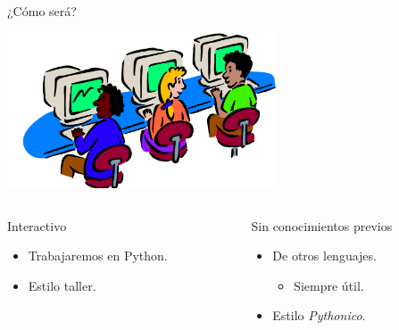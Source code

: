\documentclass[bigger,unknownkeysallowed]{beamer}
\begin{document}
\begin{frame}[label={sec:org0f1b801}]{¿Cómo será?}
\begin{center}
\begin{center}
\includegraphics[width=0.6\textwidth]{clase.png}
\end{center}
\end{center}

\begin{columns}
\begin{column}{0.5\columnwidth}
\begin{block}{Interactivo}
\begin{itemize}
\item Trabajaremos en Python.
\item Estilo taller.
\end{itemize}
\end{block}
\end{column}

\begin{column}{0.5\columnwidth}
\begin{block}{Sin conocimientos previos}
\begin{itemize}
\item De otros lenguajes.
\begin{itemize}
\item Siempre útil.
\end{itemize}

\item Estilo \emph{Pythonico}.
\end{itemize}
\end{block}
\end{column}
\end{columns}
\end{frame}
\end{document}

